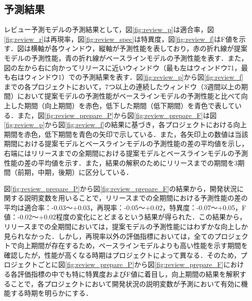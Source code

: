 \documentclass[submit]{ipsj}
\begin{document}
\subsection{予測結果}\label{sec:rq2_result}
レビュー予測モデルの予測結果として，図\ref{fig:review_p}は適合率，図\ref{fig:review_r}は再現率，図\ref{fig:review_spec}は特異度，図\ref{fig:review_f}はF値を示す．図は横軸が各ウィンドウ，縦軸が予測性能を表しており，赤の折れ線が提案モデルの予測性能，青の折れ線がベースラインモデルの予測性能を表す．また，図の左から右に向かってリリースに近いウィンドウ（最も左はウィンドウ71，最も右はウィンドウ1）での予測結果を表す．図\ref{fig:review_p}から図\ref{fig:review_f}までの各プロジェクトにおいて，7つ以上の連続したウィンドウ（3週間以上の期間）において提案モデルの予測性能がベースラインモデルの予測性能と比べて向上した期間（向上期間）を赤色，低下した期間（低下期間）を青色で表している．また，図\ref{fig:review_prepare_P}から図\ref{fig:review_prepare_F}は図\ref{fig:review_p}から図\ref{fig:review_f}の結果に基づき，各プロジェクトにおける向上期間を赤色，低下期間を青色の矢印で示している．また，各矢印上の数値は当該期間における提案モデルとベースラインモデルの予測性能の差の平均値を示し，右端にはリリースまでの全期間における提案モデルとベースラインモデルの予測性能の差の平均値を示す．また，結果の解釈のためにリリースまでの期間を3期間（前期，中期，後期）に区分している．

図\ref{fig:review_prepare_P}から図\ref{fig:review_prepare_F}の結果から，開発状況に関する説明変数を用いることで，リリースまでの全期間における予測性能の差の平均は適合率：-0.03〜+0.03，再現率：-0.05〜+0.02，特異度：-0.07〜+0.05，F値：-0.02〜+0.02程度の変化にとどまるという結果が得られた．この結果から，リリースまでの全期間においては，提案モデルの予測性能にはわずかな向上しか見られなかった．しかし，再現率以外の評価指標においては，全てのプロジェクトで向上期間が存在するため，ベースラインモデルよりも高い性能を示す期間を確認したが，性能が高くなる時期はプロジェクトによって異なる．そのため，プロジェクトごとに図\ref{fig:review_prepare_P}から図\ref{fig:review_prepare_F}における各評価指標の中でも特に特異度およびF値に着目し，向上期間の結果を解釈することで，各プロジェクトにおいて開発状況の説明変数が予測において有効に機能する時期を明らかにする．
\end{document}
